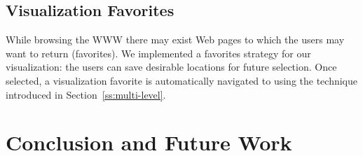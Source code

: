 \documentclass[]{article}
\begin{document}
{\subsection{Visualization Favorites}
\label{ss:viz_faves}

While browsing the WWW there may exist Web pages to which the users may want to return (favorites).
We implemented a favorites strategy for our visualization: the users can save desirable locations for future selection.
Once selected, a visualization favorite is automatically navigated to using the technique introduced in Section~\ref{ss:multi-level}.




\section{Conclusion and Future Work}
\label{se:conc}




}
\end{document}
